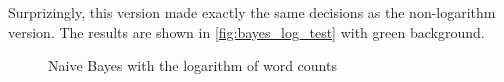 Surprizingly, this version made exactly the same decisions as the non-logarithm version. The results are shown in \autoref{fig:bayes_log_test} with green background.

\begin{figure}[htpb]
    \caption{Naive Bayes with the logarithm of word counts}
    \label{fig:bayes_log_test}
    \begin{tcolorbox}[colback=green!30!white,
            title=NB - Logarithm]
        
    \end{tcolorbox}
\end{figure}